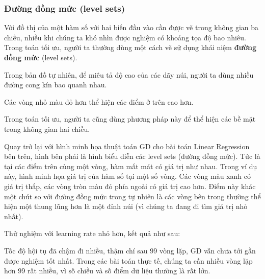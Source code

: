 \subsubsection{Đường đồng mức (level sets)}

\begin{dinhnghia}[title={Level sets}]
Với đồ thị của một hàm số với hai biến đầu vào cần được vẽ trong không gian ba chiều, nhiều khi chúng ta khó nhìn được nghiệm có khoảng tọa độ bao nhiêu. Trong toán tối ưu, người ta thường dùng một cách vẽ sử dụng khái niệm \textbf{đường đồng mức} (level sets).

Trong bản đồ tự nhiên, để miêu tả độ cao của các dãy núi, người ta dùng nhiều đường cong kín bao quanh nhau.


Các vòng nhỏ màu đỏ hơn thể hiện các điểm ở trên cao hơn.

Trong toán tối ưu, người ta cũng dùng phương pháp này để thể hiện các bề mặt trong không gian hai chiều.
\end{dinhnghia}

\begin{ynghia}[title={Level sets trong ví dụ Linear Regression}]
Quay trở lại với hình minh họa thuật toán GD cho bài toán Linear Regression bên trên, hình bên phải là hình biểu diễn các level sets (đường đồng mức). Tức là tại các điểm trên cùng một vòng, hàm mất mát có giá trị như nhau. Trong ví dụ này, hình minh họa giá trị của hàm số tại một số vòng. Các vòng màu xanh có giá trị thấp, các vòng tròn màu đỏ phía ngoài có giá trị cao hơn. Điểm này khác một chút so với đường đồng mức trong tự nhiên là các vòng bên trong thường thể hiện một thung lũng hơn là một đỉnh núi (vì chúng ta đang đi tìm giá trị nhỏ nhất).
\end{ynghia}

\begin{vidu}[title={Learning rate nhỏ hơn trên Linear Regression}]
Thử nghiệm với learning rate nhỏ hơn, kết quả như sau:

\end{vidu}

\begin{luuy}[title={Hội tụ chậm khi $\eta$ quá nhỏ}]
Tốc độ hội tụ đã chậm đi nhiều, thậm chí sau $99$ vòng lặp, GD vẫn chưa tới gần được nghiệm tốt nhất. Trong các bài toán thực tế, chúng ta cần nhiều vòng lặp hơn $99$ rất nhiều, vì số chiều và số điểm dữ liệu thường là rất lớn.
\end{luuy}

